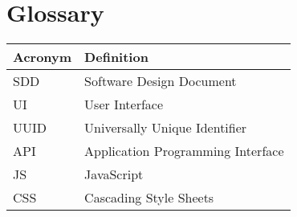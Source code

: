 \documentclass{article}
\begin{document}
\section{Glossary}
\begin{tabular}{|l|p{10cm}|}
\hline
\textbf{Acronym} & \textbf{Definition} \\ \hline
SDD & Software Design Document \\ \hline
UI & User Interface \\ \hline
UUID & Universally Unique Identifier \\ \hline
API & Application Programming Interface \\ \hline
JS & JavaScript \\ \hline
CSS & Cascading Style Sheets \\ \hline
\end{tabular}
\end{document}
